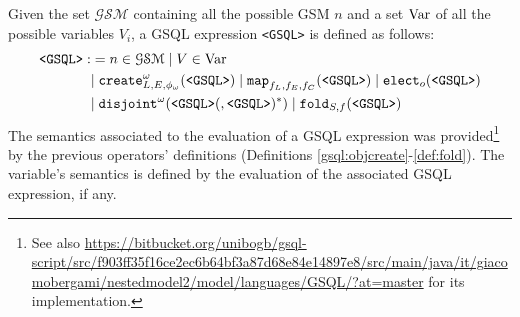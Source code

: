 \begin{definition}
Given the set  $\mathcal{GSM}$ containing all the possible GSM $n$ and a set $\textup{Var}$ of all the possible variables $V_i$, a GSQL expression \texttt{<GSQL>} is defined as follows:
\[\begin{split}
\texttt{<GSQL>}:&=n\in\mathcal{GSM}\;|\;V\in\textup{Var}\\
	&|\;\texttt{create}^\omega_{L,E,\phi_\omega}(\texttt{<GSQL>})\;|\;\texttt{map}_{f_L,f_E,f_C}(\texttt{<GSQL>})\;|\;\texttt{elect}_o(\texttt{<GSQL>})\\
	&|\;\texttt{disjoint}^\omega(\texttt{<GSQL>}(,\texttt{<GSQL>})^*)\;|\;\texttt{fold}_{S,f}(\texttt{<GSQL>})\\
\end{split}\]
The semantics associated to the evaluation of a GSQL expression was provided\footnote{See also \url{https://bitbucket.org/unibogb/gsql-script/src/f903ff35f16ce2ec6b64bf3a87d68e84e14897e8/src/main/java/it/giacomobergami/nestedmodel2/model/languages/GSQL/?at=master} for its implementation.} by the previous operators' definitions (Definitions \ref{gsql:objcreate}-\ref{def:fold}). The variable's semantics is defined by the evaluation of the associated GSQL expression, if any.
\end{definition}

